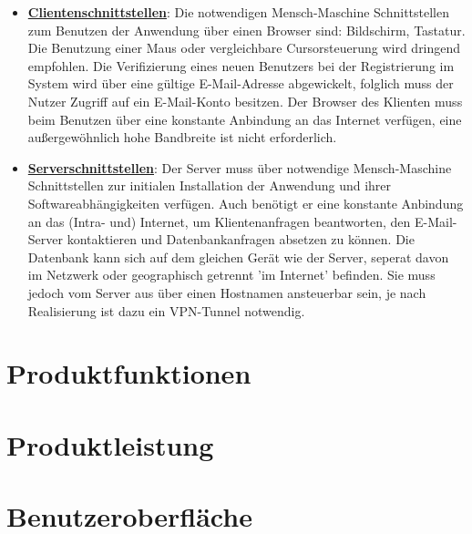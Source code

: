 \documentclass{article}
\begin{document}
\begin{itemize}
\item \underline{\textbf{Clientenschnittstellen}}: \linebreak
Die notwendigen Mensch-Maschine Schnittstellen zum Benutzen der Anwendung über einen Browser sind: Bildschirm, Tastatur. Die Benutzung einer Maus oder vergleichbare Cursorsteuerung wird dringend empfohlen. Die Verifizierung eines neuen Benutzers bei der Registrierung im System wird über eine gültige E-Mail-Adresse abgewickelt, folglich muss der Nutzer Zugriff auf ein E-Mail-Konto besitzen. Der Browser des Klienten muss beim Benutzen über eine konstante Anbindung an das Internet verfügen, eine außergewöhnlich hohe Bandbreite ist nicht erforderlich.
\item \underline{\textbf{Serverschnittstellen}}: \linebreak
Der Server muss über notwendige Mensch-Maschine Schnittstellen zur initialen Installation der Anwendung und ihrer Softwareabhängigkeiten verfügen. Auch benötigt er eine konstante Anbindung an das (Intra- und) Internet, um Klientenanfragen beantworten, den E-Mail-Server kontaktieren und Datenbankanfragen absetzen zu können. Die Datenbank kann sich auf dem gleichen Gerät wie der Server, seperat davon im Netzwerk oder geographisch getrennt 'im Internet' befinden. Sie muss jedoch vom Server aus über einen Hostnamen ansteuerbar sein, je nach Realisierung ist dazu ein VPN-Tunnel notwendig. 
\end{itemize}

\newpage

\section{Produktfunktionen} %

\newpage

\section{Produktleistung} %

\newpage

\section{Benutzeroberfläche} %
\end{document}
